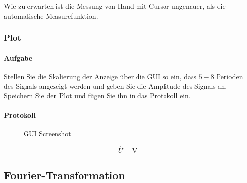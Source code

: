 \documentclass[10pt]{report}
\begin{document}
        Wie zu erwarten ist die Messung von Hand mit Cursor ungenauer, als die
        automatische Measurefunktion.

        \subsubsection{Plot}
        \paragraph{Aufgabe}
        Stellen Sie die Skalierung der Anzeige über die GUI so ein, dass $5 - 8$ Perioden des
        Signals angezeigt werden und geben Sie die Amplitude des Signals an. Speichern
        Sie den Plot und fügen Sie ihn in das Protokoll ein.
        \paragraph{Protokoll}
        \begin{center}
            \begin{figure}[H]
              \caption{GUI Screenshot}
            \end{figure}
        \end{center}
        \begin{equation*}
            \hat{U} = \si{\volt}
        \end{equation*}

        \subsection{Fourier-Transformation}
\end{document}

